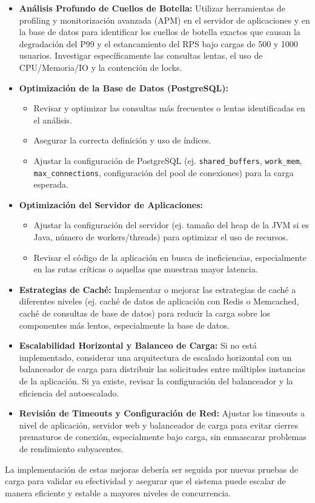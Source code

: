 \begin{itemize}
    \item \textbf{Análisis Profundo de Cuellos de Botella:} Utilizar herramientas de profiling y monitorización avanzada (APM) en el servidor de aplicaciones y en la base de datos para identificar los cuellos de botella exactos que causan la degradación del P99 y el estancamiento del RPS bajo cargas de 500 y 1000 usuarios. Investigar específicamente las consultas lentas, el uso de CPU/Memoria/IO y la contención de locks.
    \item \textbf{Optimización de la Base de Datos (PostgreSQL):}
        \begin{itemize}
            \item Revisar y optimizar las consultas más frecuentes o lentas identificadas en el análisis.
            \item Asegurar la correcta definición y uso de índices.
            \item Ajustar la configuración de PostgreSQL (ej. \texttt{shared\_buffers}, \texttt{work\_mem}, \texttt{max\_connections}, configuración del pool de conexiones) para la carga esperada.
        \end{itemize}
    \item \textbf{Optimización del Servidor de Aplicaciones:}
        \begin{itemize}
            \item Ajustar la configuración del servidor (ej. tamaño del heap de la JVM si es Java, número de workers/threads) para optimizar el uso de recursos.
            \item Revisar el código de la aplicación en busca de ineficiencias, especialmente en las rutas críticas o aquellas que muestran mayor latencia.
        \end{itemize}
    \item \textbf{Estrategias de Caché:} Implementar o mejorar las estrategias de caché a diferentes niveles (ej. caché de datos de aplicación con Redis o Memcached, caché de consultas de base de datos) para reducir la carga sobre los componentes más lentos, especialmente la base de datos.
    \item \textbf{Escalabilidad Horizontal y Balanceo de Carga:} Si no está implementado, considerar una arquitectura de escalado horizontal con un balanceador de carga para distribuir las solicitudes entre múltiples instancias de la aplicación. Si ya existe, revisar la configuración del balanceador y la eficiencia del autoescalado.
    \item \textbf{Revisión de Timeouts y Configuración de Red:} Ajustar los timeouts a nivel de aplicación, servidor web y balanceador de carga para evitar cierres prematuros de conexión, especialmente bajo carga, sin enmascarar problemas de rendimiento subyacentes.
\end{itemize}
La implementación de estas mejoras debería ser seguida por nuevas pruebas de carga para validar su efectividad y asegurar que el sistema puede escalar de manera eficiente y estable a mayores niveles de concurrencia.

